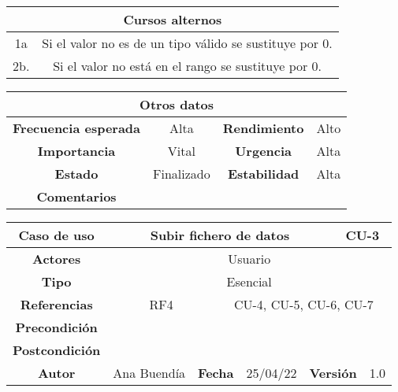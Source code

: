\begin{table}[!h]
\begin{tabular}{|c|c|}
\hline
\multicolumn{2}{|c|}{\cellcolor{cyan} \textbf{Cursos alternos}} \\
\hline
        1a       &     Si el valor no es de un tipo válido se sustituye por 0. \\
\hline
        2b.      &     Si el valor no está en el rango se sustituye por 0.         \\
\hline

\end{tabular}
\end{table}

\begin{table}[!h]
\begin{tabular}{|c|c|c|c|}
\hline
\multicolumn{4}{|c|}{\cellcolor{cyan} \textbf{Otros datos}} \\
\hline
 \cellcolor{cyan} \textbf{Frecuencia esperada}             &      Alta         &    \cellcolor{cyan} \textbf{Rendimiento}          &      Alto        \\
\hline
 \cellcolor{cyan} \textbf{Importancia}             &      Vital         &     \cellcolor{cyan} \textbf{Urgencia}         &      Alta        \\
\hline
 \cellcolor{cyan} \textbf{Estado}             &       Finalizado        &    \cellcolor{cyan} \textbf{Estabilidad}          &    Alta          \\
\hline
 \cellcolor{cyan} \textbf{Comentarios}        &  \multicolumn{3}{|c|}{} \\
\hline
\end{tabular}
\end{table}






\clearpage

\begin{table}[!h]
\begin{tabular}{|c|c|c|c|c|c|c|c|}
\hline
\rowcolor{cyan} \textbf{Caso de uso} & \multicolumn{5}{|c|}{Subir fichero de datos} & \multicolumn{2}{|c|}{CU-3} \\
\hline
\cellcolor{cyan} \textbf{Actores}              & \multicolumn{7}{|c|}{Usuario}           \\
\hline
\cellcolor{cyan} \textbf{Tipo}                 & \multicolumn{7}{|c|}{Esencial}             \\
\hline
\cellcolor{cyan} \textbf{Referencias}          & \multicolumn{2}{|c|}{RF4}           & \multicolumn{5}{|c|}{CU-4, CU-5, CU-6, CU-7}\\
\hline
\cellcolor{cyan} \textbf{Precondición}         & \multicolumn{7}{|c|}{}             \\
\hline
\cellcolor{cyan} \textbf{Postcondición}        & \multicolumn{7}{|c|}{}              \\
\hline
\cellcolor{cyan} \textbf{Autor}                &   Ana Buendía  & \multicolumn{2}{|c|}{\cellcolor{cyan} \textbf{Fecha}} &  25/04/22   & \multicolumn{2}{|c|}{\cellcolor{cyan} \textbf{Versión}} & 1.0  \\
\hline
\end{tabular}
\end{table}

